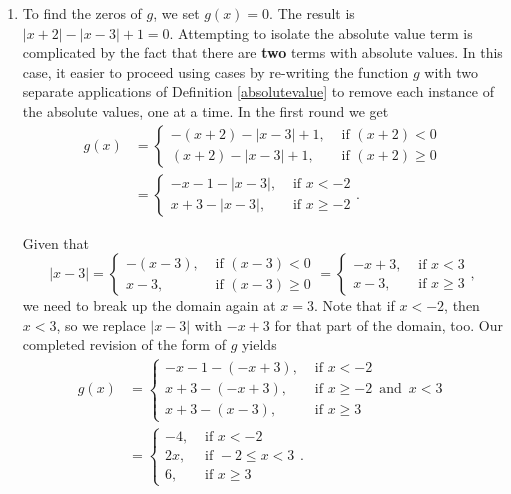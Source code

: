 {\begin{enumerate}
\item  To find the zeros of $g$, we set $g(x) = 0$.  The result is $|x+2|-|x-3| +1 = 0$.  Attempting to isolate the absolute value term is complicated by the fact that there are \textbf{two} terms with absolute values.  In this case, it easier to proceed using cases by re-writing the function $g$ with two separate applications of Definition \ref{absolutevalue} to remove each instance of the absolute values, one at a time.  In the first round we get 
\begin{align*}
 g(x) &= \begin{cases}
 		   -(x+2) - |x-3|+1, & \mbox{ if }  (x+2) <0  \\
 		    (x+2) - |x-3|+1, & \mbox{ if }  (x+2) \geq 0
 		 \end{cases}\\[3pt]
	  & = \begin{cases}
	  		-x-1 - |x-3|, & \mbox{ if }  x<-2 \\
	  		 x+3 - |x-3|, & \mbox{ if }  x \geq -2
	  	  \end{cases}.
\end{align*}

Given that 
\[
 |x-3| = \begin{cases}
 		  -(x-3), & \mbox{ if }  (x-3) <0  \\
 		    x-3, & \mbox{ if }  (x-3) \geq 0
 		 \end{cases}  = 
 		 \begin{cases}
 		   -x+3, & \mbox{ if }  x<3 \\
 		    x-3, & \mbox{ if }  x \geq 3
 		 \end{cases},
\]
we need to break up the domain again at $x=3$.  Note that if $x < -2$, then $x < 3$, so we replace $|x-3|$ with $-x+3$ for that part of the domain, too.  Our completed revision of the form of $g$ yields 
\begin{align*}
 g(x) &= \begin{cases} 
			-x-1 - (-x+3), & \mbox{ if }  x<-2 \\
			 x+3 - (-x+3), & \mbox{ if }  x \geq -2 \, \mbox{ and } \, x < 3 \\
			 x+3 - (x-3), & \mbox{ if }  x \geq 3  
		 \end{cases}\\[5pt]
	  &= \begin{cases}
	  		 -4, & \mbox{ if }  x<-2 \\                                                                                    			 2x, & \mbox{ if }  -2 \leq x < 3 \\
			  6, & \mbox{ if }  x \geq 3
		 \end{cases}. 
\end{align*}
\end{enumerate}

}
